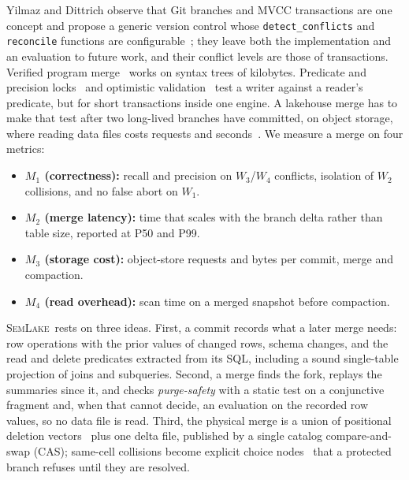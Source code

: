 \documentclass[sigconf, nonacm]{acmart}
\newcommand{\systemname}{\textsc{SemLake}}
\begin{document}
Yilmaz and Dittrich observe that Git branches and MVCC transactions are one concept and propose a generic version control whose \texttt{detect\_conflicts} and \texttt{reconcile} functions are configurable~\cite{yilmaz2025gvc}; they leave both the implementation and an evaluation to future work, and their conflict levels are those of transactions. Verified program merge~\cite{sousa2018verified, zhu2018conflict, zhu2024methodology, dasilva2024detecting, dejesus2024lightweight} works on syntax trees of kilobytes. Predicate and precision locks~\cite{eswaran1976notions, jordan1981precision} and optimistic validation~\cite{kung1981optimistic, larson2011hekaton} test a writer against a reader's predicate, but for short transactions inside one engine. A lakehouse merge has to make that test after two long-lived branches have committed, on object storage, where reading data files costs requests and seconds~\cite{durner2023exploiting}. We measure a merge on four metrics:
\begin{itemize}[leftmargin=8pt, itemsep=0pt, topsep=1pt]
    \item \textbf{$M_1$ (correctness):} recall and precision on $W_3$/$W_4$ conflicts, isolation of $W_2$ collisions, and no false abort on $W_1$.
    \item \textbf{$M_2$ (merge latency):} time that scales with the branch delta rather than table size, reported at P50 and P99.
    \item \textbf{$M_3$ (storage cost):} object-store requests and bytes per commit, merge and compaction.
    \item \textbf{$M_4$ (read overhead):} scan time on a merged snapshot before compaction.
\end{itemize}

\systemname\ rests on three ideas. First, a commit records what a later merge needs: row operations with the prior values of changed rows, schema changes, and the read and delete predicates extracted from its SQL, including a sound single-table projection of joins and subqueries. Second, a merge finds the fork, replays the summaries since it, and checks \emph{purge-safety} with a static test on a conjunctive fragment and, when that cannot decide, an evaluation on the recorded row values, so no data file is read. Third, the physical merge is a union of positional deletion vectors~\cite{okolnychyi2024petabyte, iceberg2025v3} plus one delta file, published by a single catalog compare-and-swap (CAS); same-cell collisions become explicit choice nodes~\cite{zhu2018conflict} that a protected branch refuses until they are resolved.
\end{document}
